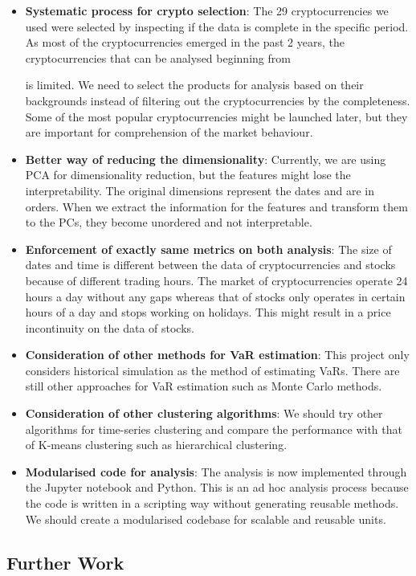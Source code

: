 \documentclass[11pt]{article} %
\theoremstyle{plain}
\theoremstyle{definition}
\begin{document}
\begin{itemize}
    \item \textbf{Systematic process for crypto selection}: The 29 cryptocurrencies we used were selected by inspecting if the data is complete in the specific period. As most of the cryptocurrencies emerged in the past 2 years, the cryptocurrencies that can be analysed beginning from \date{1st January 2016} is limited. We need to select the products for analysis based on their backgrounds instead of filtering out the cryptocurrencies by the completeness. Some of the most popular cryptocurrencies might be launched later, but they are important for comprehension of the market behaviour.
    \item \textbf{Better way of reducing the dimensionality}: Currently, we are using PCA for dimensionality reduction, but the features might lose the interpretability. The original dimensions represent the dates and are in orders. When we extract the information for the features and transform them to the PCs, they become unordered and not interpretable.
    \item \textbf{Enforcement of exactly same metrics on both analysis}: The size of dates and time is different between the data of cryptocurrencies and stocks because of different trading hours. The market of cryptocurrencies operate 24 hours a day without any gaps whereas that of stocks only operates in certain hours of a day and stops working on holidays. This might result in a price incontinuity on the data of stocks.
    \item \textbf{Consideration of other methods for VaR estimation}: This project only considers historical simulation as the method of estimating VaRs. There are still other approaches for VaR estimation such as Monte Carlo methods.
    \item \textbf{Consideration of other clustering algorithms}: We should try other algorithms for time-series clustering and compare the performance with that of K-means clustering such as hierarchical clustering.
    \item \textbf{Modularised code for analysis}: The analysis is now implemented through the Jupyter notebook and Python. This is an ad hoc analysis process because the code is written in a scripting way without generating reusable methods. We should create a modularised codebase for scalable and reusable units.
\end{itemize}

\subsection{Further Work}
\end{document}
